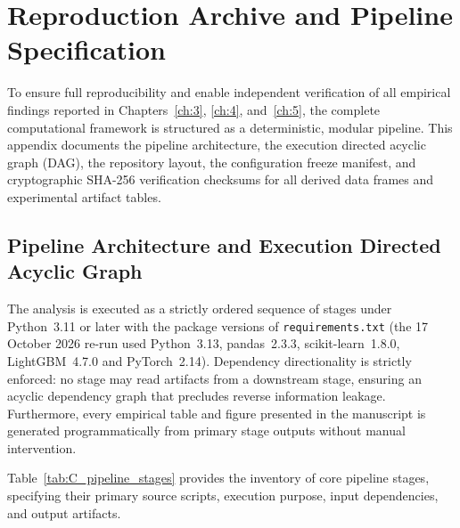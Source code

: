 \chapter{Reproduction Archive and Pipeline Specification}\label{app:C}

To ensure full reproducibility and enable independent verification of all empirical findings reported in Chapters~\ref{ch:3}, \ref{ch:4}, and~\ref{ch:5}, the complete computational framework is structured as a deterministic, modular pipeline. This appendix documents the pipeline architecture, the execution directed acyclic graph (DAG), the repository layout, the configuration freeze manifest, and cryptographic SHA-256 verification checksums for all derived data frames and experimental artifact tables.

\section{Pipeline Architecture and Execution Directed Acyclic Graph}
\label{sec:C_1}

The analysis is executed as a strictly ordered sequence of stages under Python~3.11 or later with the package versions of \texttt{requirements.txt} (the 17 October 2026 re-run used Python~3.13, pandas~2.3.3, scikit-learn~1.8.0, LightGBM~4.7.0 and PyTorch~2.14). Dependency directionality is strictly enforced: no stage may read artifacts from a downstream stage, ensuring an acyclic dependency graph that precludes reverse information leakage. Furthermore, every empirical table and figure presented in the manuscript is generated programmatically from primary stage outputs without manual intervention.

Table~\ref{tab:C_pipeline_stages} provides the inventory of core pipeline stages, specifying their primary source scripts, execution purpose, input dependencies, and output artifacts.

